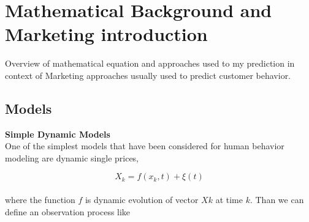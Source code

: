 \section{Mathematical Background and Marketing introduction} \label{sec:introduction}
Overview of mathematical equation and approaches used to my prediction in context of Marketing approaches usually used to predict customer behavior.\\
\subsection{Models} \label{subsec:models}
\textbf{Simple Dynamic Models} \label{subsec:simpleDynamicModels}\\
One of the simplest models that have been considered for human behavior modeling are dynamic single prices,

\begin{equation} \label{eq:1}
X_k = f(x_k, t) + \xi(t)
\end{equation}
\\
where the function $f$ is dynamic evolution of vector $Xk$ at time $k$.
Than we can define an observation process like

